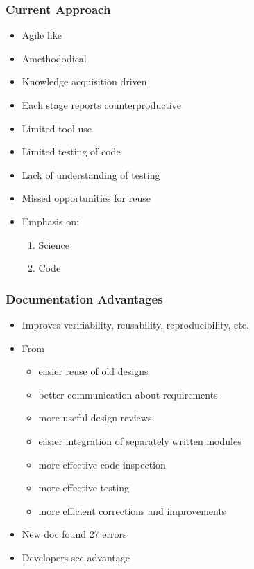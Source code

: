 \documentclass[t,12pt,numbers,fleqn]{beamer}
\begin{document}

\begin{frame}

\frametitle{Current Approach}

\begin{itemize}
\item Agile like \cite{CarverEtAl2007}
\item Amethododical \cite{Kelly2013}
\item Knowledge acquisition driven \cite{Kelly2015}
\item Each stage reports counterproductive \cite{Roache1998}
\item Limited tool use \cite{Wilson2006}
\item Limited testing of code \cite{KellyAndSanders2008a}
\item Lack of understanding of testing \cite{Merali2010}
\item Missed opportunities for reuse \cite{Owen1998} 
\item Emphasis on:
\begin{enumerate}
\item Science~\cite{Kelly2007}
\item Code
\end{enumerate}
\end{itemize}

\end{frame}


\begin{frame}

\frametitle{Documentation Advantages}

\begin{itemize}
\item Improves verifiability, reusability, reproducibility, etc.
\item From \cite{Parnas2010}
\begin{itemize}
\item easier reuse of old designs
\item better communication about requirements
\item more useful design reviews
\item easier integration of separately written modules
\item more effective code inspection
\item more effective testing
\item more efficient corrections and improvements
\end{itemize}
\item New doc found 27 errors \cite{SmithAndKoothoor2016}
\item Developers see advantage \cite{SmithJegatheesanAndKelly2016}
\end{itemize}

\end{frame}
\end{document}
